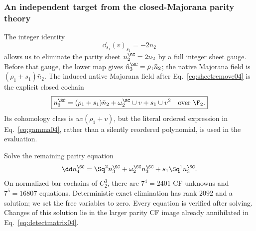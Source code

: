 \subsubsection{An independent target from the closed-Majorana parity theory}
The integer identity
\begin{equation}\label{eq:sheetremove04}
\dd_{s_1}(v)_{s_1}=-2{n_2}
\end{equation}
allows us to eliminate the parity sheet $n_2^{\SC}=2{n_2}$ by a full integer sheet gauge. Before that gauge, the lower map gives $\check n_3^{\SC}={\rho_1}{\bar n_2}$; the native Majorana field is $({\rho_1}+{s_1}){\bar n_2}$. The induced native Majorana field after Eq.~\eqref{eq:sheetremove04} is the explicit closed cochain
\begin{equation}\label{eq:gamma04}
\boxed{n_3^{\SC}=({\rho_1}+{s_1}){\bar n_2}+\omega_2^{\SC}\cup v+{s_1}\cup v^2\quad\text{over }\F_2.}
\end{equation}
Its cohomology class is $uv({\rho_1}+v)$, but the literal ordered expression in Eq.~\eqref{eq:gamma04}, rather than a silently reordered polynomial, is used in the evaluation.

Solve the remaining parity equation
\begin{equation}\label{eq:solveparity04}
\dd n_4^{\SC}=\Sq^2n_3^{\SC}+\omega_2^{\SC}n_3^{\SC}+{s_1}\Sq^1n_3^{\SC}.
\end{equation}
On normalized bar cochains of $C_2^3$, there are $7^4=2401$ CF unknowns and $7^5=16807$ equations. Deterministic exact elimination has rank $2092$ and a solution; we set the free variables to zero. Every equation is verified after solving. Changes of this solution lie in the larger parity CF image already annihilated in Eq.~\eqref{eq:detectmatrix04}.


